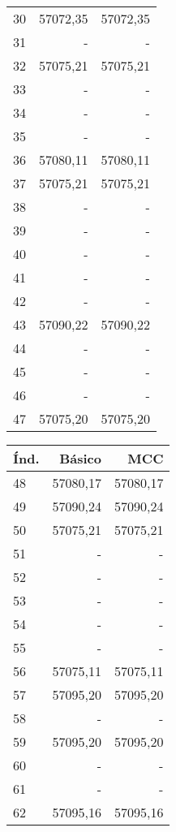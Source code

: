 \begin{appendix}
\begin{table}[h!]
\begin{tabular}{|l|r|r|}
30&57072,35 & 57072,35 \\
31&-             & -             \\
32&57075,21 & 57075,21 \\
33&-             & -             \\
34&-             & -             \\
35&-             & -             \\
36&57080,11 & 57080,11 \\
37&57075,21 & 57075,21 \\
38&-             & -             \\
39&-             & -             \\
40&-             & -             \\
41&-             & -             \\
42&-             & -             \\
43&57090,22 & 57090,22\\
44&-             & -             \\
45&-             & -             \\
46&-             & -             \\
47&57075,20 & 57075,20 \\\hline
\end{tabular}
\quad
\begin{tabular}{|l|r|r|}
\hline
\textbf{\'Ind.} & \textbf{B\'asico} & \textbf{MCC} \\
\hline
48&57080,17 & 57080,17 \\
49&57090,24 & 57090,24 \\
50&57075,21 & 57075,21 \\
51&-             & -             \\
52&-             & -             \\
53&-             & -             \\
54&-             & -             \\
55&-             & -             \\
56&57075,11  & 57075,11  \\
57&57095,20 & 57095,20 \\
58&-             & -             \\
59&57095,20 & 57095,20\\
60&-             & -             \\
61&-             & -             \\
62&57095,16 & 57095,16\\

\end{tabular}
\end{table}
\end{appendix}
